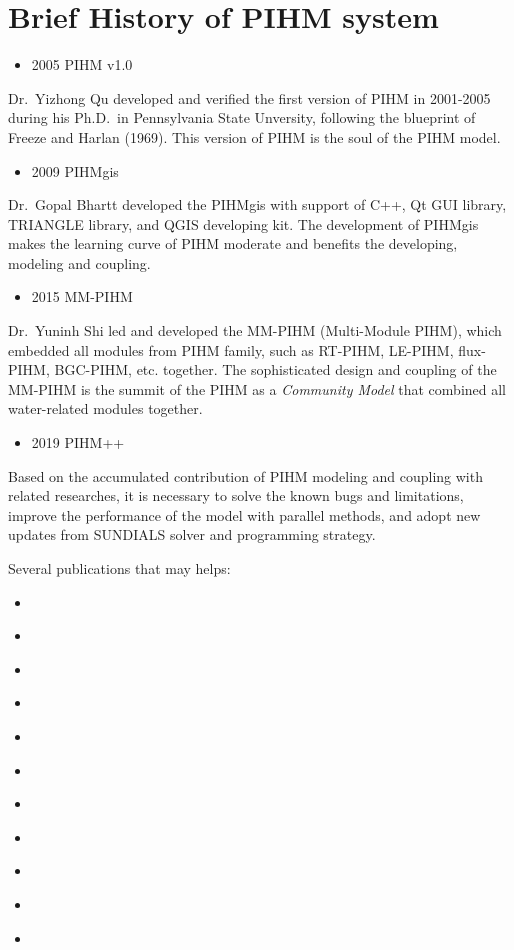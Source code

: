 \documentclass[]{scrbook}
\providecommand{\tightlist}{%
  \setlength{\itemsep}{0pt}\setlength{\parskip}{0pt}}
\begin{document}
\section{Brief History of PIHM
system}\label{brief-history-of-pihm-system}

\begin{itemize}
\tightlist
\item
  2005 PIHM v1.0
\end{itemize}

Dr.~Yizhong Qu \citep{Qu2007} developed and verified the first version
of PIHM in 2001-2005 during his Ph.D.~in Pennsylvania State Unversity,
following the blueprint of Freeze and Harlan (1969). This version of
PIHM is the soul of the PIHM model.

\begin{itemize}
\tightlist
\item
  2009 PIHMgis
\end{itemize}

Dr.~Gopal Bhartt \citep{Bhatt2012} developed the PIHMgis with support of
C++, Qt GUI library, TRIANGLE library, and QGIS developing kit. The
development of PIHMgis makes the learning curve of PIHM moderate and
benefits the developing, modeling and coupling.

\begin{itemize}
\tightlist
\item
  2015 MM-PIHM
\end{itemize}

Dr.~Yuninh Shi led and developed the MM-PIHM (Multi-Module PIHM), which
embedded all modules from PIHM family, such as RT-PIHM, LE-PIHM,
flux-PIHM, BGC-PIHM, etc. together. The sophisticated design and
coupling of the MM-PIHM is the summit of the PIHM as a \emph{Community
Model} that combined all water-related modules together.

\begin{itemize}
\tightlist
\item
  2019 PIHM++
\end{itemize}

Based on the accumulated contribution of PIHM modeling and coupling with
related researches, it is necessary to solve the known bugs and
limitations, improve the performance of the model with parallel methods,
and adopt new updates from SUNDIALS solver and programming strategy.

Several publications that may helps:

\begin{itemize}
\tightlist
\item
  \citep{Qu2004}
\item
  \citep{Qu2007}
\item
  \citep{Li2008}
\item
  \citep{Kumar2004a}
\item
  \citep{Kumar2009d}
\item
  \citep{Yu2015}
\item
  \citep{Yu2014}
\item
  \citep{Li2011}
\item
  \citep{Shi2015}
\item
  \citep{Shi2015a}
\item
  \citep{Bhatt2014}
\end{itemize}
\end{document}
